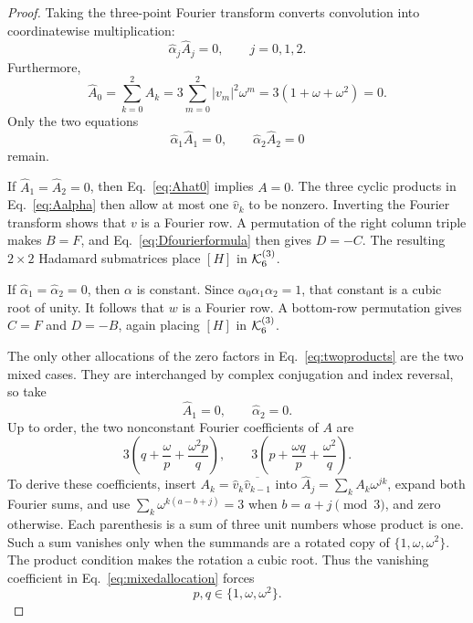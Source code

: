 \begin{proof}
Taking the three-point Fourier transform converts convolution into coordinatewise multiplication:
\begin{equation}
\widehat\alpha_j\widehat A_j=0,\qquad j=0,1,2.
\label{eq:fourierproduct}
\end{equation}
Furthermore,
\begin{equation}
\widehat A_0=\sum_{k=0}^{2}A_k
=3\sum_{m=0}^{2}|v_m|^2\omega^m
=3(1+\omega+\omega^2)=0.
\label{eq:Ahat0}
\end{equation}
Only the two equations
\begin{equation}
\widehat\alpha_1\widehat A_1=0,
\qquad
\widehat\alpha_2\widehat A_2=0
\label{eq:twoproducts}
\end{equation}
remain.

If $\widehat A_1=\widehat A_2=0$, then Eq.~\eqref{eq:Ahat0} implies $A=0$. The three cyclic products in Eq.~\eqref{eq:Aalpha} then allow at most one $\widehat v_k$ to be nonzero.  Inverting the Fourier transform shows that $v$ is a Fourier row.  A permutation of the right column triple makes $B=F$, and Eq.~\eqref{eq:Dfourierformula} then gives $D=-C$.  The resulting $2\times2$ Hadamard submatrices place $[H]$ in $\mathcal K_6^{(3)}$.

If $\widehat\alpha_1=\widehat\alpha_2=0$, then $\alpha$ is constant.  Since $\alpha_0\alpha_1\alpha_2=1$, that constant is a cubic root of unity.  It follows that $w$ is a Fourier row.  A bottom-row permutation gives $C=F$ and $D=-B$, again placing $[H]$ in $\mathcal K_6^{(3)}$.

The only other allocations of the zero factors in Eq.~\eqref{eq:twoproducts} are the two mixed cases.  They are interchanged by complex conjugation and index reversal, so take
\begin{equation}
\widehat A_1=0,\qquad \widehat\alpha_2=0.
\label{eq:mixedallocation}
\end{equation}
Up to order, the two nonconstant Fourier coefficients of $A$ are
\begin{equation}
3\left(q+\frac{\omega}{p}+\frac{\omega^2p}{q}\right),
\qquad
3\left(p+\frac{\omega q}{p}+\frac{\omega^2}{q}\right).
\label{eq:AhatExplicit}
\end{equation}
To derive these coefficients, insert $A_k=\widehat v_k\overline{\widehat v_{k-1}}$ into $\widehat A_j=\sum_kA_k\omega^{jk}$, expand both Fourier sums, and use $\sum_k\omega^{k(a-b+j)}=3$ when $b=a+j\pmod3$, and zero otherwise. Each parenthesis is a sum of three unit numbers whose product is one. Such a sum vanishes only when the summands are a rotated copy of $\{1,\omega,\omega^2\}$. The product condition makes the rotation a cubic root.  Thus the vanishing coefficient in Eq.~\eqref{eq:mixedallocation} forces
\begin{equation}
p,q\in\{1,\omega,\omega^2\}.
\label{eq:pqcubic}
\end{equation}


\end{proof}
